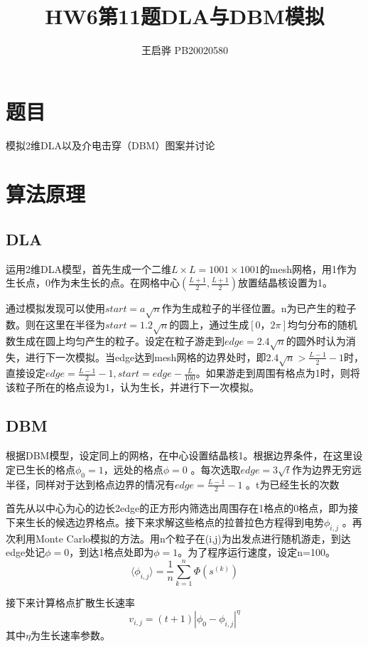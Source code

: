 \documentclass{article}
\title{\songti \zihao{2}\bfseries HW6第11题DLA与DBM模拟}
\author{王启骅 PB20020580}
\begin{document}
	\maketitle
	\section{题目}
模拟2维DLA以及介电击穿（DBM）图案并讨论
	
	\section{算法原理}
\subsection{DLA}
运用2维DLA模型，首先生成一个二维$ L\times L=1001\times1001 $的mesh网格，用1作为生长点，0作为未生长的点。在网格中心$ (\frac{L+1}{2},\frac{L+1}{2}) $放置结晶核设置为1。


通过模拟发现可以使用$ start=a\sqrt{n} $作为生成粒子的半径位置。n为已产生的粒子数。则在这里在半径为$ start=1.2\sqrt{n} $的圆上，通过生成$ [0，2\pi] $均匀分布的随机数生成在圆上均匀产生的粒子。设定在粒子游走到$ edge=2.4\sqrt{n} $的圆外时认为消失，进行下一次模拟。当edge达到mesh网格的边界处时，即$ 2.4\sqrt{n}>\frac{L-1}{2}-1 $时，直接设定$ edge=\frac{L-1}{2}-1,start=edge-\frac{L}{100} $。如果游走到周围有格点为1时，则将该粒子所在的格点设为1，认为生长，并进行下一次模拟。
\subsection{DBM}
根据DBM模型，设定同上的网格，在中心设置结晶核1。根据边界条件，在这里设定已生长的格点$ \phi_0=1 $，远处的格点$ \phi=0 $ 。每次选取$ edge=3\sqrt{t} $作为边界无穷远半径，同样对于达到格点边界的情况有$ edge=\frac{L-1}{2}-1 $ 。t为已经生长的次数


首先从以中心为心的边长2edge的正方形内筛选出周围存在1格点的0格点，即为接下来生长的候选边界格点。接下来求解这些格点的拉普拉色方程得到电势$ \phi_{i,j} $ 。再次利用Monte Carlo模拟的方法。用n个粒子在(i,j)为出发点进行随机游走，到达edge处记$ \phi=0 $，到达1格点处即为$ \phi=1 $。为了程序运行速度，设定n=100。
\begin{equation}
	\langle\phi_{i,j}\rangle=\frac{1}{n}\sum_{k=1}^{n}\Phi(s^{(k)})
\end{equation}


接下来计算格点扩散生长速率
\begin{equation}
	v_{i,j}=(t+1)|\phi_0-\phi_{i,j}|^{\eta}
\end{equation}
其中$ \eta $为生长速率参数。
\end{document}

